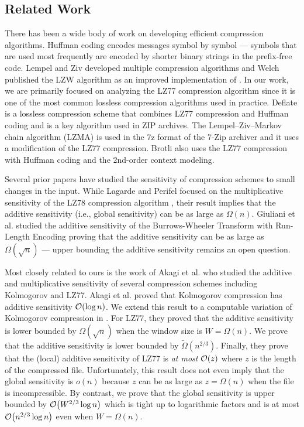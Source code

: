 \subsection{Related Work} 

There has been a wide body of work on developing efficient compression algorithms. Huffman coding \cite{Huffman52} encodes messages symbol by symbol --- symbols that are used most frequently are encoded by shorter binary strings in the prefix-free code. Lempel and Ziv \cite{LZ77,LZ78} developed multiple compression algorithms and Welch \cite{Welch84} published the LZW algorithm as an improved implementation of \cite{LZ78}. In our work, we are primarily focused on analyzing the LZ77 compression algorithm \cite{LZ77} since it is one of the most common lossless compression algorithms used in practice. Deflate \cite{rfc1951} is a lossless compression scheme that combines LZ77 compression \cite{LZ77} and Huffman coding \cite{Huffman52} and is a key algorithm used in ZIP archives. The Lempel–Ziv–Markov chain algorithm (LZMA) is used in the 7z format of the 7-Zip archiver and it uses a modification of the LZ77 compression. Brotli \cite{rfc7932} also uses the LZ77 compression with Huffman coding and the 2nd-order context modeling. 

Several prior papers have studied the sensitivity of compression schemes \cite{lagarde2018lempel,AFI23,GILRSU23} to small changes in the input. While Lagarde and Perifel \cite{lagarde2018lempel} focused on the multiplicative sensitivity of the LZ78 compression algorithm \cite{LZ78}, their result implies that the additive sensitivity (i.e., global sensitivity) can be as large as $\Omega(n)$. Giuliani et al. \cite{GILRSU23} studied the additive sensitivity of the Burrows-Wheeler Transform with Run-Length Encoding proving that the additive sensitivity can be as large as $\Omega(\sqrt{n})$ --- upper bounding the additive sensitivity remains an open question. 

Most closely related to ours is the work of Akagi et al. \cite{AFI23} who studied the additive and multiplicative sensitivity of several compression schemes including Kolmogorov and LZ77. Akagi et al. \cite{AFI23} proved that Kolmogorov compression has additive sensitivity $\O{\log n}$. We extend this result to a computable variation of Kolmogorov compression in . For LZ77, they proved that the additive sensitivity is lower bounded by $\Omega(\sqrt{n})$ when the window size is $W=\Omega(n)$. We prove that the additive sensitivity is lower bounded by $\widetilde\Omega(n^{2/3})$. Finally, they prove that the (local) additive sensitivity of LZ77 is {\em at most} $\O{z}$ where $z$ is the length of the compressed file. Unfortunately, this result does not even imply that the global sensitivity is $o(n)$ because $z$ can be as large as $z= \Omega(n)$ when the file is incompressible. By contrast, we prove that the global sensitivity is upper bounded by $\O{W^{2/3} \log n}$ which is tight up to logarithmic factors and is at most $\O{n^{2/3} \log n}$ even when $W = \Omega(n)$.


